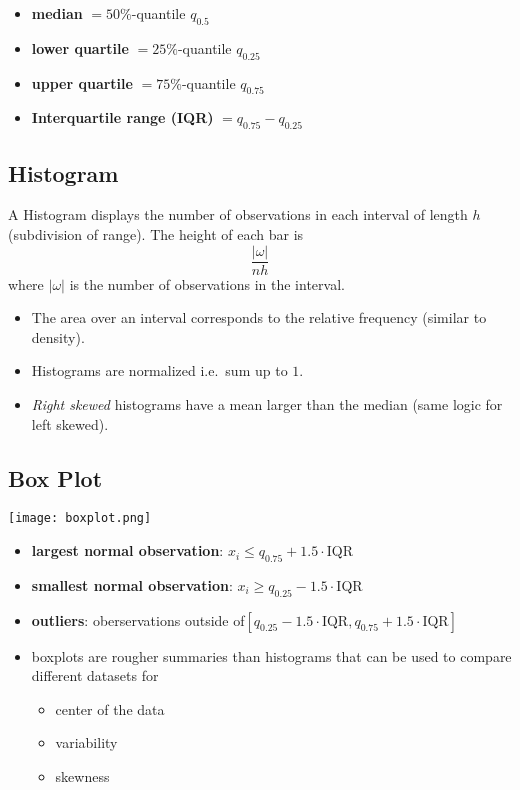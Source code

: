 \newpar{}
\begin{itemize}
    \item \textbf{median} $= 50\%$-quantile $q_{0.5}$
    \item \textbf{lower quartile} $= 25\%$-quantile $q_{0.25}$
    \item \textbf{upper quartile} $= 75\%$-quantile $q_{0.75}$
    \item \textbf{Interquartile range (IQR)} $= q_{0.75} - q_{0.25}$
\end{itemize}

\subsection{Histogram}
A Histogram displays the number of observations in each interval of length $h$ (subdivision of range).
The height of each bar is
\noindent\begin{equation*}
    \frac{|\omega|}{nh}
\end{equation*}
where $|\omega|$ is the number of observations in the interval.
\begin{itemize}
    \item The area over an interval corresponds to the relative frequency (similar to density).
    \item Histograms are normalized i.e.\ sum up to $1$.
    \item \textit{Right skewed} histograms have a mean larger than the median (same logic for left skewed).
\end{itemize}

\subsection{Box Plot}
\begin{center}
    \texttt{[image: boxplot.png]}
\end{center}
\begin{itemize}
    \item \textbf{largest normal observation}: $x_i\leq q_{0.75}+1.5\cdot$IQR
    \item \textbf{smallest normal observation}: $x_i\geq q_{0.25}-1.5\cdot$IQR
    \item \textbf{outliers}: oberservations outside of\newline $[q_{0.25}-1.5\cdot\text{IQR},q_{0.75}+1.5\cdot\text{IQR}]$
    \item boxplots are rougher summaries than histograms that can be used to compare different datasets for
          \begin{itemize}
              \item center of the data
              \item variability
              \item skewness
          \end{itemize}
\end{itemize}

